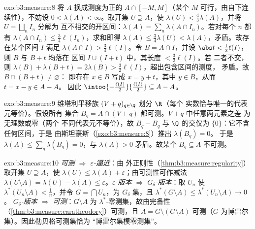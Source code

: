 \begin{solution}{exo:b3:measure:8}
将 $A$ 换成测度为正的 $A \cap [-M, M]$（某个 $M$
可行，由自下连续性），不妨设 $0 < \lambda(A) <
\infty$。取开集 $U \supseteq A$，使 $\lambda(U) <
\frac43\lambda(A)$，并将 $U = \bigsqcup_nI_n$ 分解为
互不相交的开区间：$\lambda(A) = \sum_n\lambda(A\cap
I_n)$。若对每个 $n$ 都有 $\lambda(A\cap I_n) \leq
\frac34\ell(I_n)$，求和即得 $\lambda(A) \leq
\frac34\lambda(U) < \lambda(A)$，矛盾。故存在某个区间 $I$ 满足
$\lambda(A\cap I) > \frac34\ell(I)$。令 $B = A \cap I$，并设
$\abs t < \frac12\ell(I)$，则 $B$ 与 $B + t$ 均落在
区间 $I \cup (I + t)$ 中，其长度 $< \frac32\ell(I)$。若
二者不交，则 $\lambda(B) + \lambda(B + t) = 2\lambda(B)
> \frac32\ell(I)$，超出包含区间的测度，
矛盾。故 $B \cap (B + t) \neq \varnothing$：
即存在 $x \in B$ 写成 $x = y + t$，其中 $y \in B$，从而 $t = x -
y \in A - A$。
因此 $\intoo{-\frac{\ell(I)}2}{\frac{\ell(I)}2} \subseteq A -
A$。
\end{solution}

\begin{solution}{exo:b3:measure:9}
维塔利平移族 $(V + q)_{q\in\Q}$ 划分 $\R$（每个
实数恰与唯一的代表元等价）。假设所有
集合 $B_q = A \cap (V + q)$ 都可测。$V + q$ 中任意两元素之差
为无理数或零（两个
不同代表元不等价），故 $B_q - B_q$
与 $\Q$ 的交仅为 $\{0\}$：它不含任何区间，于是
由斯坦豪斯（\cref{exo:b3:measure:8}）推出 $\lambda(B_q) = 0$。
于是 $\lambda(A) \leq \sum_{q}\lambda(B_q) = 0$，与
$\lambda(A) > 0$ 矛盾。故某个 $B_q \subseteq A$ 不可测。
\end{solution}

\begin{solution}{exo:b3:measure:10}
\emph{可测 $\Rightarrow$ $\varepsilon$-逼近}：由
外正则性（\cref{thm:b3:measure:regularity}）取开集
$U \supseteq A$，使 $\lambda(U) \leq \lambda(A) +
\varepsilon$；由可测性可作减法
$\lambda(U\setminus A) = \lambda(U) - \lambda(A) \leq
\varepsilon$。\emph{$\varepsilon$-版本 $\Rightarrow$
$G_\delta$-版本}：取 $U_n$ 使 $\lambda^*(U_n\setminus
A) < \frac1n$，并令 $G = \bigcap U_n$，为 $G_\delta$ 集，且
$\lambda^*(G\setminus A) \leq \lambda^*(U_n\setminus A) \to 0$。
\emph{$G_\delta$-版本 $\Rightarrow$ 可测}：$G\setminus
A$ 为 $\lambda^*$-零测集，故由完备性
（\cref{thm:b3:measure:caratheodory}）可测，且 $A = G \setminus
(G\setminus A)$ 可测（$G$ 为博雷尔集）。因此勒贝格可测集恰为
“博雷尔集模零测集”。
\end{solution}

